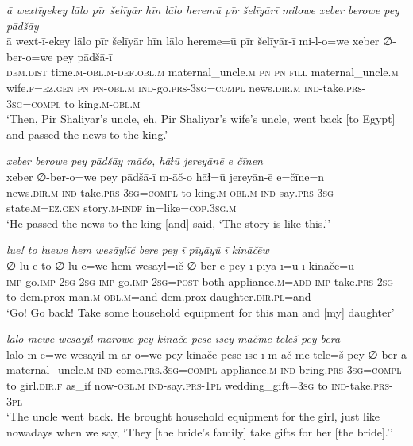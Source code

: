 \ea \label{ŽP.258}
\textit{ā wextīyekey lālo pīr šelīyār hīn lālo heremū pīr šelīyārī milowe xeber berowe pey pādšāy} \\ 
\gll ā wext-ī-ekey lālo pīr šelīyār hīn lālo hereme=ū pīr šelīyār-ī mi-l-o=we xeber ∅-ber-o=we pey pādšā-ī \\ 
 \textsc{dem.dist} time\textsc{.m}\textsc{-obl}\textsc{.m}\textsc{-def}\textsc{.obl}\textsc{.m} maternal\_uncle\textsc{.m} \textsc{pn} \textsc{pn} \textsc{fill} maternal\_uncle\textsc{.m} wife\textsc{.f}\textsc{\textsc{=ez.gen}} \textsc{pn} \textsc{pn}\textsc{-obl}\textsc{.m} \textsc{ind-}go\textsc{.prs}\textsc{-3sg}\textsc{=compl} news\textsc{.dir}\textsc{.m} \textsc{ind-}take\textsc{.prs}\textsc{-3sg}\textsc{=compl} to king\textsc{.m}\textsc{-obl}\textsc{.m} \\ 
\glt `Then, Pir Shaliyar’s uncle, eh, Pir Shaliyar’s wife’s uncle, went back [to Egypt] and passed the news to the king.'
\z 
 
\ea \label{ŽP.259}
\textit{xeber berowe pey pādšāy māčo, hāɫū jereyānē e čīnen} \\ 
\gll xeber ∅-ber-o=we pey pādšā-ī m-āč-o hāɫ=ū jereyān-ē e=čīne=n \\ 
 news\textsc{.dir}\textsc{.m} \textsc{ind-}take\textsc{.prs}\textsc{-3sg}\textsc{=compl} to king\textsc{.m}\textsc{-obl}\textsc{.m} \textsc{ind-}say\textsc{.prs}\textsc{-3sg} state\textsc{.m}\textsc{\textsc{=ez.gen}} story\textsc{.m}\textsc{-indf} in=like\textsc{=cop}\textsc{.3sg}\textsc{.m} \\ 
\glt `He passed the news to the king [and] said, ‘The story is like this.’'
\z 
 
\ea \label{ŽP.262}
\textit{lue! to luewe hem wesāylīč bere pey ī pīyāyū ī kināčēw} \\ 
\gll ∅-lu-e to ∅-lu-e=we hem wesāyl=īč ∅-ber-e pey ī pīyā-ī=ū ī kināčē=ū \\ 
 \textsc{imp-}go.\textsc{imp-}\textsc{2sg} \textsc{2sg} \textsc{imp-}go.\textsc{imp-}\textsc{2sg}\textsc{=\textsc{post}} both appliance\textsc{.m}\textsc{=add} \textsc{imp-}take\textsc{.prs}-\textsc{2sg} to dem.prox man\textsc{.m}\textsc{-obl}\textsc{.m}=and dem.prox daughter\textsc{.dir}\textsc{.pl}=and \\ 
\glt `Go! Go back! Take some household equipment for this man and [my] daughter'
\z 
 
\ea \label{ŽP.264}
\textit{lālo mēwe wesāyil mārowe pey kināčē pēse īsey māčmē teleš pey berā} \\ 
\gll lālo m-ē=we wesāyil m-ār-o=we pey kināčē pēse īse-ī m-āč-mē tele=š pey ∅-ber-ā \\ 
 maternal\_uncle\textsc{.m} \textsc{ind-}come\textsc{.prs}\textsc{.3sg}\textsc{=compl} appliance\textsc{.m} \textsc{ind-}bring\textsc{.prs}\textsc{-3sg}\textsc{=compl} to girl\textsc{.dir}\textsc{.f} as\_if now\textsc{-obl}\textsc{.m} \textsc{ind-}say\textsc{.prs}\textsc{-1pl} wedding\_gift\textsc{=3sg} to \textsc{ind-}take\textsc{.prs}\textsc{-3pl} \\ 
\glt `The uncle went back. He brought household equipment for the girl, just like nowadays when we say, ‘They [the bride’s family] take gifts for her [the bride].’'
\z 
 
